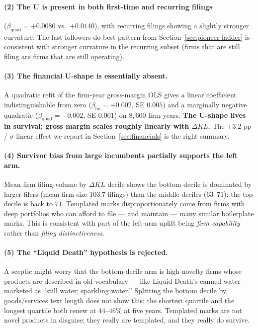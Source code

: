 \documentclass[11pt]{article}
\begin{document}
\paragraph{(2) The U is present in both first-time and recurring
filings} ($\beta_{\text{quad}} = +0.0080$ vs.\ $+0.0140$), with
recurring filings showing a slightly stronger curvature. The
fast-followers-do-best pattern from
Section~\ref{sec:pioneer-ladder} is consistent with stronger
curvature in the recurring subset (firms that are still filing
are firms that are still operating).

\paragraph{(3) The financial U-shape is essentially absent.}
A quadratic refit of the firm-year gross-margin OLS gives a linear
coefficient indistinguishable from zero ($\beta_{\text{lin}} =
+0.002$, SE $0.005$) and a marginally negative quadratic
($\beta_{\text{quad}} = -0.002$, SE $0.001$) on $8{,}600$
firm-years. \textbf{The U-shape lives in survival; gross margin
scales roughly linearly with $\Delta KL$.} The
$+3.2$ pp / $\sigma$ linear effect we report in
Section~\ref{sec:financials} is the right summary.

\paragraph{(4) Survivor bias from large incumbents partially supports
the left arm.} Mean firm filing-volume by $\Delta KL$ decile shows
the bottom decile is dominated by larger filers (mean firm-size
$103.7$ filings) than the middle deciles ($63$--$71$); the top
decile is back to $71$. Templated marks disproportionately come
from firms with deep portfolios who can afford to file --- and
maintain --- many similar boilerplate marks. This is consistent
with part of the left-arm uplift being \emph{firm capability}
rather than \emph{filing distinctiveness}.

\paragraph{(5) The ``Liquid Death'' hypothesis is rejected.}
A sceptic might worry that the bottom-decile arm is high-novelty
firms whose products are described in old vocabulary --- like
Liquid Death's canned water marketed as ``still water; sparkling
water.'' Splitting the bottom decile by goods/services text length
does not show this: the shortest quartile and the longest quartile
both renew at $44$--$46\%$ at five years. Templated marks are not
novel products in disguise; they really are templated, and they
really do survive.
\end{document}
